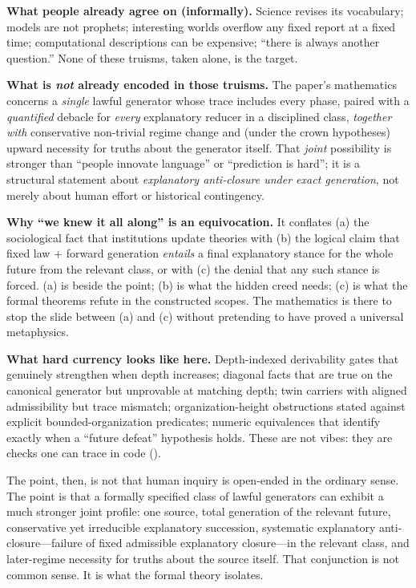 \documentclass[11pt,a4paper]{article}
\newenvironment{keybox}[1]{%
  \Needspace*{8\baselineskip}%
  \begin{tcolorbox}[
    enhanced, breakable=false,
    colback=blue!5, colframe=blue!45!black, coltitle=black,
    colbacktitle=blue!14, boxrule=0.85pt, arc=2.5pt,
    left=9pt, right=9pt, top=6pt, bottom=6pt,
    titlerule=0.55pt, fonttitle=\bfseries, title={#1},
    before upper=\raggedright,
    before skip=0.9\baselineskip, after skip=0.9\baselineskip
  ]%
}{%
  \end{tcolorbox}%
}
\theoremstyle{definition}
\begin{document}
\begin{keybox}{Separating folklore from the proved configuration}
\textbf{What people already agree on (informally).} Science revises its vocabulary; models are not prophets; interesting worlds overflow any fixed report at a fixed time; computational descriptions can be expensive; ``there is always another question.'' None of these truisms, taken alone, is the target.

\medskip
\textbf{What is \emph{not} already encoded in those truisms.} The paper's mathematics concerns a \emph{single} lawful generator whose trace includes every phase, paired with a \emph{quantified} debacle for \emph{every} explanatory reducer in a disciplined class, \emph{together with} conservative non-trivial regime change and (under the crown hypotheses) upward necessity for truths about the generator itself. That \emph{joint} possibility is stronger than ``people innovate language'' or ``prediction is hard''; it is a structural statement about \emph{explanatory anti-closure under exact generation}, not merely about human effort or historical contingency.

\medskip
\textbf{Why ``we knew it all along'' is an equivocation.} It conflates (a) the sociological fact that institutions update theories with (b) the logical claim that fixed law + forward generation \emph{entails} a final explanatory stance for the whole future from the relevant class, or with (c) the denial that any such stance is forced. (a) is beside the point; (b) is what the hidden creed needs; (c) is what the formal theorems refute in the constructed scopes. The mathematics is there to stop the slide between (a) and (c) without pretending to have proved a universal metaphysics.

\medskip
\textbf{What hard currency looks like here.} Depth-indexed derivability gates that genuinely strengthen when depth increases; diagonal facts that are true on the canonical generator but unprovable at matching depth; twin carriers with aligned admissibility but trace mismatch; organization-height obstructions stated against explicit bounded-organization predicates; numeric equivalences that identify exactly when a ``future defeat'' hypothesis holds. These are not vibes: they are checks one can trace in code ().

\medskip
The point, then, is not that human inquiry is open-ended in the ordinary sense. The point is that a formally specified class of lawful generators can exhibit a much stronger joint profile: one source, total generation of the relevant future, conservative yet irreducible explanatory succession, systematic explanatory anti-closure---failure of fixed admissible explanatory closure---in the relevant class, and later-regime necessity for truths about the source itself. That conjunction is not common sense. It is what the formal theory isolates.
\end{keybox}
\end{document}
